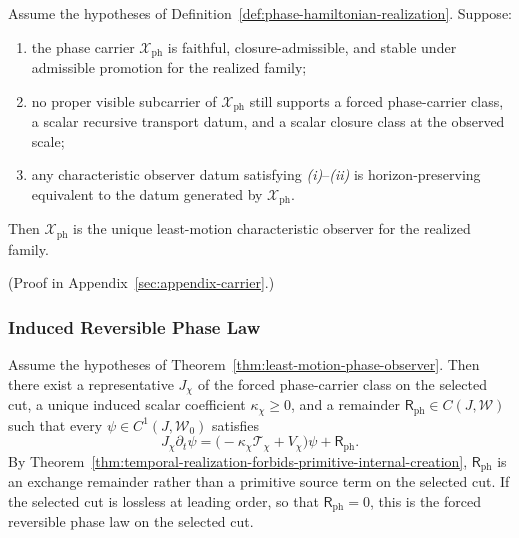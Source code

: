 \begin{theorem}
\label{thm:least-motion-phase-observer}
Assume the hypotheses of Definition~\ref{def:phase-hamiltonian-realization}.
Suppose:
\begin{enumerate}[label=(\roman*),itemsep=0.2em]
\item the phase carrier \(\mathcal X_{\mathrm{ph}}\) is faithful,
      closure-admissible, and stable under admissible promotion for the
      realized family;
\item no proper visible subcarrier of \(\mathcal X_{\mathrm{ph}}\) still
      supports a forced phase-carrier class, a scalar recursive transport
      datum, and a scalar closure class at the observed scale;
\item any characteristic observer datum satisfying \emph{(i)}--\emph{(ii)} is
      horizon-preserving equivalent to the datum generated by
      \(\mathcal X_{\mathrm{ph}}\).
\end{enumerate}
Then \(\mathcal X_{\mathrm{ph}}\) is the unique least-motion characteristic
observer for the realized family.
\end{theorem}

(Proof in Appendix~\ref{sec:appendix-carrier}.)

\subsubsection{Induced Reversible Phase Law}

\begin{theorem}
\label{thm:induced-phase-hamiltonian-law}
Assume the hypotheses of
Theorem~\ref{thm:least-motion-phase-observer}. Then there exist a
representative \(J_{\chi}\) of the forced phase-carrier class on the selected
cut, a unique induced scalar coefficient \(\kappa_{\chi}\ge 0\), and a
remainder \(\mathsf R_{\mathrm{ph}}\in C(J,\mathcal W)\) such that every
\(\psi\in C^1(J,\mathcal W_0)\) satisfies
\[
J_{\chi}\partial_t\psi
=
\bigl(-\kappa_{\chi}\mathcal T_{\chi}+V_{\chi}\bigr)\psi
+
\mathsf R_{\mathrm{ph}}.
\]
By
Theorem~\ref{thm:temporal-realization-forbids-primitive-internal-creation},
\(\mathsf R_{\mathrm{ph}}\) is an exchange remainder rather than a primitive
source term on the selected cut.
If the selected cut is lossless at leading order, so that
\(\mathsf R_{\mathrm{ph}}=0\), this is the forced reversible phase law on the
selected cut.
\end{theorem}

